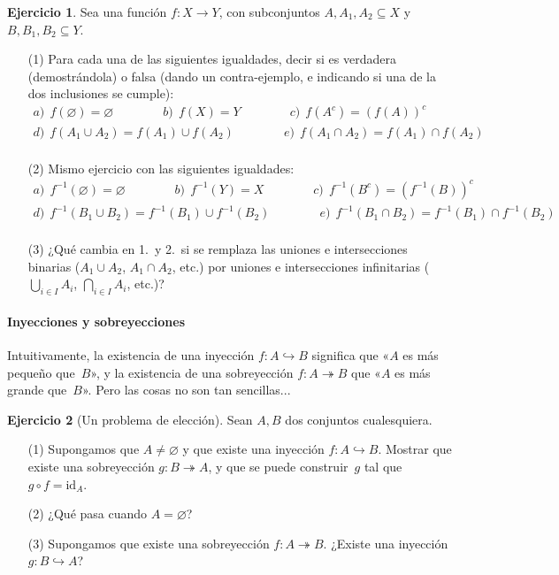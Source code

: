 \documentclass[a4paper,12pt]{book}
\def\id{\mathrm{id}}
\def\into{\hookrightarrow}
\def\onto{\twoheadrightarrow}
\def\id{\mathrm{id}}
\def\into{\hookrightarrow}
\def\onto{\twoheadrightarrow}
\theoremstyle{definition}
\newtheorem{ejercicio}{Ejercicio}
\begin{document}
	\begin{ejercicio}
	Sea una función $f:X\to Y$, con subconjuntos
	$A,A_1,A_2\subseteq X$ y $B,B_1,B_2\subseteq Y$.
	\begin{enumerate}\parskip-.5ex
		\item[(1)] Para cada una de las siguientes igualdades, decir si es
		verdadera (demostrándola) o falsa (dando un contra-ejemplo, e
		indicando si una de la dos inclusiones se cumple):
		$$\begin{array}{c}
			a)~~f(\varnothing)=\varnothing\qquad\qquad
			b)~~f(X)=Y\qquad\qquad c)~~f(A^c)=(f(A))^c\\[3pt]
			d)~~f(A_1\cup A_2)=f(A_1)\cup f(A_2)\qquad\qquad
			e)~~f(A_1\cap A_2)=f(A_1)\cap f(A_2)\\
		\end{array}$$
		\item[(2)] Mismo ejercicio con las siguientes igualdades:
		$$\begin{array}{c}
			a)~~f^{-1}(\varnothing)=\varnothing\qquad\qquad
			b)~~f^{-1}(Y)=X\qquad\qquad c)~~f^{-1}(B^c)=(f^{-1}(B))^c\\[3pt]
			d)~~f^{-1}(B_1\cup B_2)=f^{-1}(B_1)\cup f^{-1}(B_2)\qquad\qquad
			e)~~f^{-1}(B_1\cap B_2)=f^{-1}(B_1)\cap f^{-1}(B_2)\\
		\end{array}$$
		\item[(3)] ¿Qué cambia en 1.\ y 2.\ si se remplaza las uniones e
		intersecciones binarias ($A_1\cup A_2$, $A_1\cap A_2$, etc.) por
		uniones e intersecciones infinitarias ($\bigcup_{i\in I}A_i$,
		$\bigcap_{i\in I}A_i$, etc.)?
	\end{enumerate}
\end{ejercicio}
	
	
	
	
	


	
	\paragraph*{Inyecciones y sobreyecciones}
	Intuitivamente, la existencia de una inyección $f:A\into B$ significa
	que «$A$ es más pequeño que~$B$», y la existencia de una sobreyección
	$f:A\onto B$ que «$A$ es más grande que~$B$».
	Pero las cosas no son tan sencillas...
	
	\begin{ejercicio}[Un problema de elección]
		Sean $A,B$ dos conjuntos cualesquiera.
		\begin{enumerate}
			\item[(1)] Supongamos que $A\neq\varnothing$ y que existe una
			inyección $f:A\into B$.
			Mostrar que existe una sobreyección $g:B\onto A$, y que se puede
			construir~$g$ tal que $g\circ f=\id_A$.
			\item[(2)] ¿Qué pasa cuando $A=\varnothing$?
			\item[(3)] Supongamos que existe una sobreyección $f:A\onto B$.
			¿Existe una inyección $g:B\into A$?
		\end{enumerate}

	\end{ejercicio}
	
\end{document}
